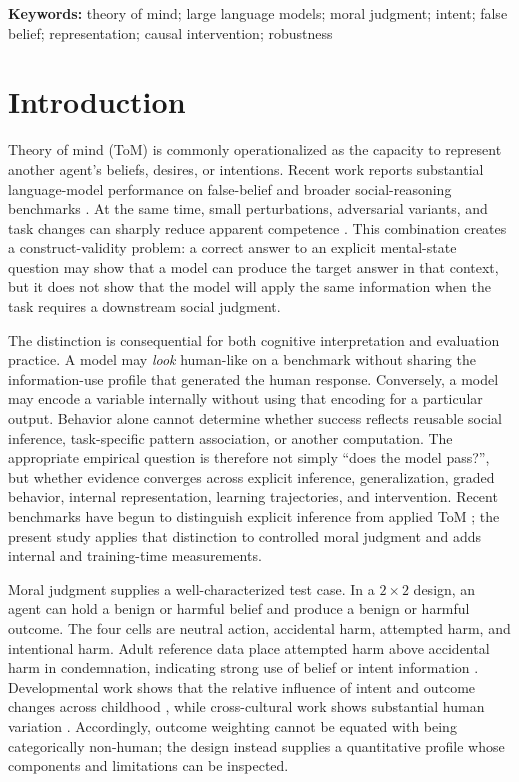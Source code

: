 \documentclass[11pt]{article}
\begin{document}
\noindent\textbf{Keywords:} theory of mind; large language models; moral judgment; intent; false belief; representation; causal intervention; robustness

\section{Introduction}

Theory of mind (ToM) is commonly operationalized as the capacity to represent another agent's beliefs, desires, or intentions.
Recent work reports substantial language-model performance on false-belief and broader social-reasoning benchmarks \citep{gandhi2023bigtom,kosinski2024evaluating,strachan2024testing,chen2024tombench}.
At the same time, small perturbations, adversarial variants, and task changes can sharply reduce apparent competence \citep{ullman2023alterations,shapira2024clever}.
This combination creates a construct-validity problem: a correct answer to an explicit mental-state question may show that a model can produce the target answer in that context, but it does not show that the model will apply the same information when the task requires a downstream social judgment.

The distinction is consequential for both cognitive interpretation and evaluation practice.
A model may \emph{look} human-like on a benchmark without sharing the information-use profile that generated the human response.
Conversely, a model may encode a variable internally without using that encoding for a particular output.
Behavior alone cannot determine whether success reflects reusable social inference, task-specific pattern association, or another computation.
The appropriate empirical question is therefore not simply ``does the model pass?'', but whether evidence converges across explicit inference, generalization, graded behavior, internal representation, learning trajectories, and intervention.
Recent benchmarks have begun to distinguish explicit inference from applied ToM \citep{gu2026simpletom}; the present study applies that distinction to controlled moral judgment and adds internal and training-time measurements.

Moral judgment supplies a well-characterized test case.
In a $2\times2$ design, an agent can hold a benign or harmful belief and produce a benign or harmful outcome.
The four cells are neutral action, accidental harm, attempted harm, and intentional harm.
Adult reference data place attempted harm above accidental harm in condemnation, indicating strong use of belief or intent information \citep{young2007neural}.
Developmental work shows that the relative influence of intent and outcome changes across childhood \citep{cushman2013development}, while cross-cultural work shows substantial human variation \citep{barrett2016societies,curtin2020kinship}.
Accordingly, outcome weighting cannot be equated with being categorically non-human; the design instead supplies a quantitative profile whose components and limitations can be inspected.
\end{document}
